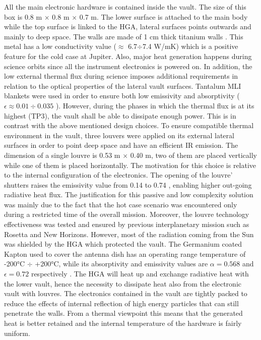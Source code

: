     All the main electronic hardware is contained inside the vault. The size of this box is 0.8 m $\times$ 0.8 m $\times$ 0.7 m. The lower surface is attached to the main body while the top surface is linked to the HGA, lateral surfaces points outwards and mainly to deep space. The walls are made of 1 cm thick titanium walls \cite{Rad_vault}. This metal has a low conductivity value ($\approx$ 6.7$\div$7.4 W/mK) which is a positive feature for the cold case at Jupiter. Also, major heat generation happens during science orbits since all the instrument electronics is powered on. In addition, the low external thermal flux during science imposes additional requirements in relation to the optical properties of the lateral vault surfaces. 
    Tantalum MLI blankets were used in order to ensure both low emissivity and absorptivity ($\epsilon \approx 0.01 \div 0.035$ \cite{mli_blankets}). 
    However, during the phases in which the thermal flux is at its highest (TP3), the vault shall be able to dissipate enough power. This is in contrast with the above mentioned design choices. To ensure compatible thermal environment in the vault, three louvers were applied on its external lateral surfaces in order to point deep space and have an efficient IR emission. The dimension of a single louvre is 0.53 m $\times$ 0.40 m, two of them are placed vertically while one of them is placed horizontally. The motivation for this choice is relative to the internal configuration of the electronics. The opening of the louvre' shutters raises the emissivity value from 0.14 to 0.74 , enabling higher out-going radiative heat flux.\cite{louvers}
    The justification for this passive and low complexity solution  was mainly due to the fact that the hot case scenario was encountered only during a restricted time of the overall mission. Moreover, the louvre technology effectiveness was tested and ensured by previous interplanetary mission such as Rosetta and New Horizons. 
    However, most of the radiation coming from the Sun was shielded by the HGA which protected the vault. 
    The Germanium coated Kapton used to cover the antenna dish has an operating range temperature of -200°C $\div$ +200°C, while its absorptivity and emissivity values are $\alpha = 0.568$ and  $\epsilon = 0.72$ respectively \cite{ge_kapton}.
    The HGA will heat up and exchange radiative heat with the lower vault, hence the necessity to dissipate heat also from the electronic vault with louvres.
    The electronics contained in the vault are tightly packed to reduce the effects of internal reflection of high energy particles that can still penetrate the walls. From a thermal viewpoint this means that the generated heat is better retained and the internal temperature of the hardware is fairly uniform.
    
